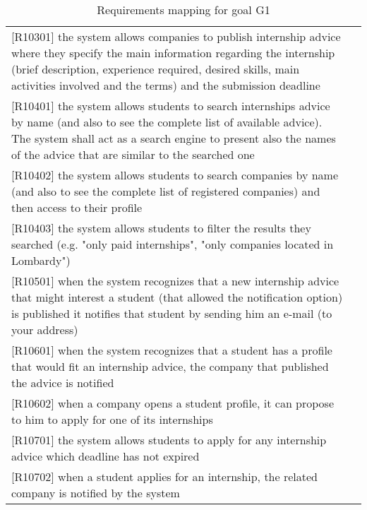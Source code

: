 \begin{table} [h!]
\begin{tabular}{ || P{7.5cm} P{7.5cm} || }
					[R10301] the system allows companies to publish internship advice where they specify the main information regarding the internship (brief description, experience required, desired skills, main activities involved and the terms) and the submission deadline & \\
					
					[R10401] the system allows students to search internships advice by name (and also to see the complete list of available advice). The system shall act as a search engine to present also the names of the advice that are similar to the searched one & \\
					
					[R10402] the system allows students to search companies by name (and also to see the complete list of registered companies) and then access to their profile & \\
					
					[R10403] the system allows students to filter the results they searched (e.g. "only paid internships", "only companies located in Lombardy") & \\
					
					[R10501] when the system recognizes that a new internship advice that might interest a student (that allowed the notification option) is published it notifies that student by sending him an e-mail (to your address) & \\
					
					[R10601] when the system recognizes that a student has a profile that would fit an internship advice, the company that published the advice is notified & \\
					
					[R10602] when a company opens a student profile, it can propose to him to apply for one of its internships & \\
					
					[R10701] the system allows students to apply for any internship advice which deadline has not expired & \\
					
					[R10702] when a student applies for an internship, the related company is notified by the system & \\ [1ex]
					\hline
				\end{tabular}
				\caption{Requirements mapping for goal G1}
				\label {table:1}
			\end{table}
